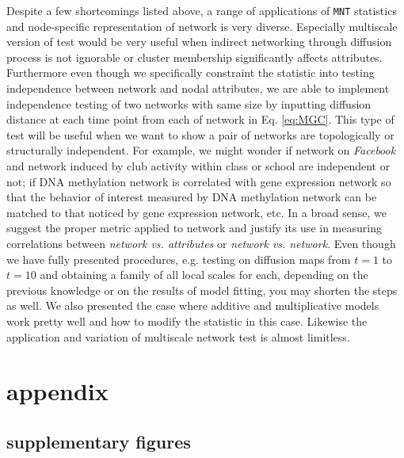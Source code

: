 \documentclass[12pt]{article}
\theoremstyle{definition}
\begin{document}
Despite a few shortcomings listed above, a range of applications of \texttt{MNT} statistics and node-specific representation of network is very diverse. Especially multiscale version of test would be very useful when indirect networking through diffusion process is not ignorable or cluster membership significantly affects attributes. Furthermore even though we specifically constraint the statistic into testing independence between network and nodal attributes, we are able to implement independence testing of two networks with same size by inputting diffusion distance at each time point from each of network in Eq. \ref{eq:MGC}. This type of test will be useful when we want to show a pair of networks are topologically or structurally independent. For example, we might wonder if network on \textit{Facebook} and network induced by club activity within class or school are independent or not; if DNA methylation network is correlated with gene expression network \citep{bartlett2014dna} so that the behavior of interest measured by DNA methylation network can be matched to that noticed by gene expression network, etc.  In a broad sense, we suggest the proper metric applied to network and justify its use in measuring correlations between \textit{network vs. attributes} or \textit{network vs. network}. Even though we have fully presented procedures, e.g. testing on diffusion maps from $t=1$ to $t=10$  and obtaining a family of all local scales for each, depending on the previous knowledge or on the results of model fitting, you may shorten the steps as well. We also presented the case where additive and multiplicative models work pretty well and how to modify the statistic in this case. Likewise the application and variation of multiscale network test is almost limitless. 


 	
\appendix
\section{appendix}
\label{sec:appendix}
\subsection{supplementary figures}
\end{document}
